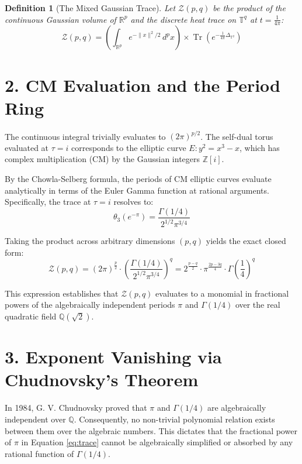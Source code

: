 \documentclass[12pt]{article}
\newtheorem{definition}{Definition}
\begin{document}
\begin{definition}[The Mixed Gaussian Trace]
Let $\mathcal{Z}(p, q)$ be the product of the continuous Gaussian volume of $\mathbb{R}^p$ and the discrete heat trace on $\mathbb{T}^q$ at $t = \frac{1}{4\pi}$:
\begin{equation}
    \mathcal{Z}(p, q) = \left( \int_{\mathbb{R}^p} e^{-\|x\|^2/2} \, d^px \right) \times \operatorname{Tr}\left(e^{-\frac{1}{4\pi}\Delta_{\mathbb{T}^q}}\right)
\end{equation}
\end{definition}

\section*{2. CM Evaluation and the Period Ring}
The continuous integral trivially evaluates to $(2\pi)^{p/2}$. The self-dual torus evaluated at $\tau = i$ corresponds to the elliptic curve $E: y^2 = x^3 - x$, which has complex multiplication (CM) by the Gaussian integers $\mathbb{Z}[i]$.

By the Chowla-Selberg formula, the periods of CM elliptic curves evaluate analytically in terms of the Euler Gamma function at rational arguments. Specifically, the trace at $\tau=i$ resolves to:
\begin{equation}
    \theta_3(e^{-\pi}) = \frac{\Gamma(1/4)}{2^{1/2}\pi^{3/4}}
\end{equation}

Taking the product across arbitrary dimensions $(p,q)$ yields the exact closed form:
\begin{equation}
    \mathcal{Z}(p, q) = (2\pi)^{\frac{p}{2}} \cdot \left(\frac{\Gamma(1/4)}{2^{1/2}\pi^{3/4}}\right)^q = 2^{\frac{p-q}{2}} \cdot \pi^{\frac{2p-3q}{4}} \cdot \Gamma\left(\frac{1}{4}\right)^q \label{eq:trace}
\end{equation}

This expression establishes that $\mathcal{Z}(p,q)$ evaluates to a monomial in fractional powers of the algebraically independent periods $\pi$ and $\Gamma(1/4)$ over the real quadratic field $\mathbb{Q}(\sqrt{2})$.

\section*{3. Exponent Vanishing via Chudnovsky's Theorem}
In 1984, G. V. Chudnovsky proved that $\pi$ and $\Gamma(1/4)$ are algebraically independent over $\mathbb{Q}$. Consequently, no non-trivial polynomial relation exists between them over the algebraic numbers. This dictates that the fractional power of $\pi$ in Equation \ref{eq:trace} cannot be algebraically simplified or absorbed by any rational function of $\Gamma(1/4)$.
\end{document}
